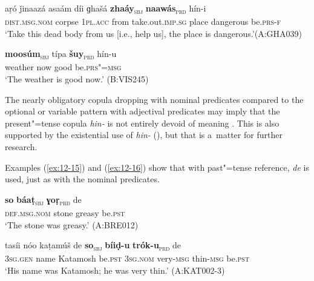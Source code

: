 \begin{exe}
\ex
\label{ex:12-13}
\gll aṛó ǰinaazá asaám díi ɡhašá {\ob}\textbf{zhaáy}{\cb}\textsubscript{\textsc{\upshape sbj}} {\ob}\textbf{naawás}{\cb}\textsubscript{\textsc{\upshape prd}} hín-i\\
\textsc{dist.msg.nom} corpse \textsc{1pl.acc} from take.out.\textsc{imp.sg}  place dangerous be.\textsc{prs-f} \\
\glt `Take this dead body from us [i.e., help us], the place is dangerous.'\newline (A:GHA039)
\end{exe}
\begin{exe}
\ex
\label{ex:12-14}
\gll {\ob}\textbf{moosúm}{\cb}\textsubscript{\textsc{\upshape sbj}} típa {\ob}\textbf{šuy}{\cb}\textsubscript{\textsc{\upshape prd}} hín-u\\
weather now good be.\textsc{prs"=msg}\\
\glt `The weather is good now.' (B:VIS245)
\end{exe}

The nearly obligatory copula dropping with nominal predicates compared to the optional or variable pattern with adjectival predicates may imply that the present"=tense copula \textit{hin-} is not entirely devoid of meaning \citep[8, 31, 66]{pustet2003}. This is also supported by the existential use of \textit{hin-} (), but that is a~matter for further research.



Examples (\ref{ex:12-15}) and (\ref{ex:12-16}) show that with past"=tense reference, \textit{de} is used, just as with the nominal predicates.

\begin{exe}
\ex
\label{ex:12-15}
\gll {\ob}\textbf{so} \textbf{báaṭ}{\cb}\textsubscript{\textsc{\upshape sbj}} {\ob}\textbf{ɣoṛ}{\cb}\textsubscript{\textsc{\upshape prd}} de \\
\textsc{def.msg.nom} stone greasy be.\textsc{pst} \\
\glt `The stone was greasy.' (A:BRE012)
\end{exe}
\begin{exe}
\ex
\label{ex:12-16}
\gll tasíi nóo kaṭamúš de {\ob}\textbf{so}{\cb}\textsubscript{\textsc{\upshape sbj}} {\ob}\textbf{bíiḍ-u} \textbf{trók-u}{\cb}\textsubscript{\textsc{\upshape prd}} de\\
\textsc{3sg.gen} name Katamosh be.\textsc{pst} \textsc{3sg.nom} very-\textsc{msg} thin-\textsc{msg} be.\textsc{pst}\\
\glt `His name was Katamosh; he was very thin.' (A:KAT002-3)
\end{exe}

